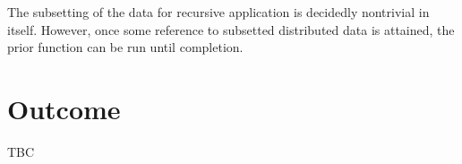 \documentclass[a4paper,10pt]{article}
\begin{document}
The subsetting of the data for recursive application is decidedly nontrivial in
itself.
However, once some reference to subsetted distributed data is attained, the
prior function can be run until completion.

\section{Outcome}

TBC

\printbibliography{}
\end{document}
